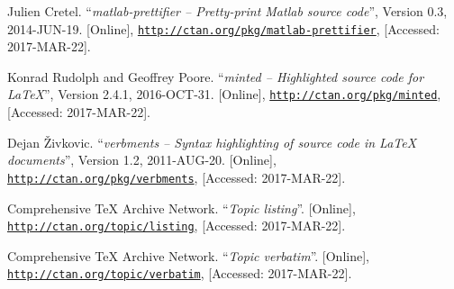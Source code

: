 \documentclass[article,a4paper,oneside,10pt]{memoir}
\begin{document}
\begin{thebibliography}{1}
        Julien Cretel.
        ``\emph{matlab-prettifier -- Pretty-print Matlab source code}'',
        Version 0.3,
        2014-JUN-19.
        [Online],
        \href{http://ctan.org/pkg/matlab-prettifier}{\nolinkurl{http://ctan.org/pkg/matlab-prettifier}},
        [Accessed: 2017-MAR-22].

        Konrad Rudolph and Geoffrey Poore.
        ``\emph{minted -- Highlighted source code for \LaTeX}'',
        Version 2.4.1,
        2016-OCT-31.
        [Online],
        \href{http://ctan.org/pkg/minted}{\nolinkurl{http://ctan.org/pkg/minted}},
        [Accessed: 2017-MAR-22].

        Dejan Živkovic.
        ``\emph{verbments -- Syntax highlighting of source code in \LaTeX{} documents}'',
        Version 1.2,
        2011-AUG-20.
        [Online],
        \href{http://ctan.org/pkg/verbments}{\nolinkurl{http://ctan.org/pkg/verbments}},
        [Accessed: 2017-MAR-22].

        Comprehensive \TeX{} Archive Network.
        ``\emph{Topic listing}''.
        [Online],
        \href{http://ctan.org/topic/listing}{\nolinkurl{http://ctan.org/topic/listing}},
        [Accessed: 2017-MAR-22].

        Comprehensive \TeX{} Archive Network.
        ``\emph{Topic verbatim}''.
        [Online],
        \href{http://ctan.org/topic/verbatim}{\nolinkurl{http://ctan.org/topic/verbatim}},
        [Accessed: 2017-MAR-22].


\end{thebibliography}
\end{document}

